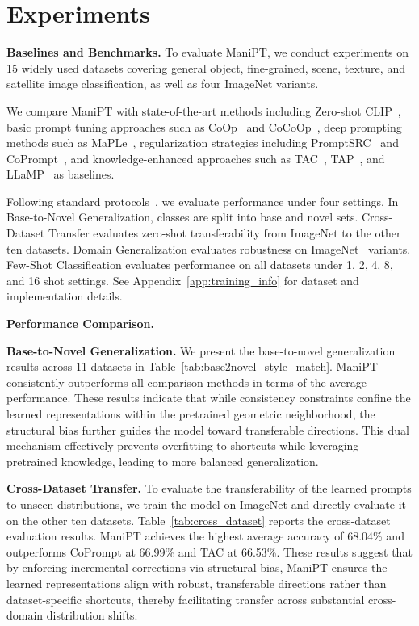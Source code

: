 \documentclass{article}
\theoremstyle{plain}
\theoremstyle{definition}
\theoremstyle{remark}
\begin{document}
	\section{Experiments}
	\textbf{Baselines and Benchmarks.} To evaluate ManiPT, we conduct experiments on 15 widely used datasets covering general object, fine-grained, scene, texture, and satellite image classification, as well as four ImageNet variants.
	
	We compare ManiPT with state-of-the-art methods including Zero-shot CLIP~\citep{radford2021learning}, basic prompt tuning approaches such as CoOp~\citep{zhou2022coop} and CoCoOp~\citep{zhou2022cocoop}, deep prompting methods such as MaPLe~\citep{khattak2023maple}, regularization strategies including PromptSRC~\citep{yao2023promptsrc} and CoPrompt~\citep{zhang2023coprompt}, and knowledge-enhanced approaches such as TAC~\citep{liu2023tac}, TAP~\citep{wang2023tap}, and LLaMP~\citep{zhang2023llamp} as baselines.
	
	Following standard protocols~\citep{zhou2022coop}, we evaluate performance under four settings. In Base-to-Novel Generalization, classes are split into base and novel sets. Cross-Dataset Transfer evaluates zero-shot transferability from ImageNet to the other ten datasets. Domain Generalization evaluates robustness on ImageNet~\citep{deng2009imagenet} variants. Few-Shot Classification evaluates performance on all datasets under 1, 2, 4, 8, and 16 shot settings. See Appendix~\ref{app:training_info} for dataset and implementation details.
	
	\textbf{Performance Comparison.}
	
	\textbf{Base-to-Novel Generalization.} We present the base-to-novel generalization results across 11 datasets in Table~\ref{tab:base2novel_style_match}. ManiPT consistently outperforms all comparison methods in terms of the average performance. These results indicate that while consistency constraints confine the learned representations within the pretrained geometric neighborhood, the structural bias further guides the model toward transferable directions. This dual mechanism effectively prevents overfitting to shortcuts while leveraging pretrained knowledge, leading to more balanced generalization.
	
	\textbf{Cross-Dataset Transfer.} To evaluate the transferability of the learned prompts to unseen distributions, we train the model on ImageNet and directly evaluate it on the other ten datasets. Table~\ref{tab:cross_dataset} reports the cross-dataset evaluation results. ManiPT achieves the highest average accuracy of 68.04\% and outperforms CoPrompt at 66.99\% and TAC at 66.53\%. These results suggest that by enforcing incremental corrections via structural bias, ManiPT ensures the learned representations align with robust, transferable directions rather than dataset-specific shortcuts, thereby facilitating transfer across substantial cross-domain distribution shifts.
	
\end{document}
